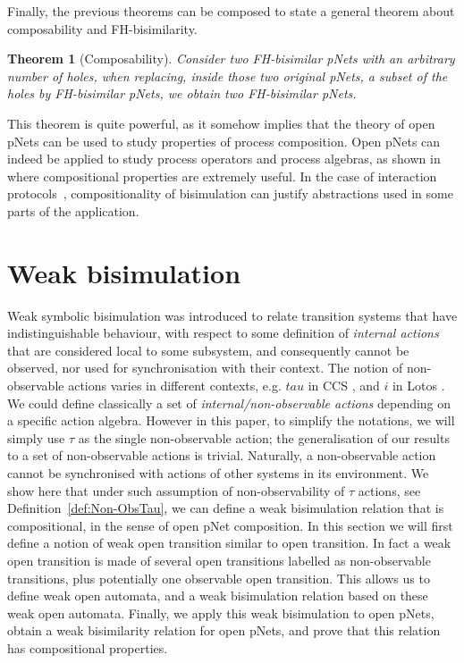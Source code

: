 \documentclass{elsarticle}
\newtheorem{thm}{Theorem}
\begin{document}
Finally, the previous theorems can be composed to state a general theorem about 
composability and FH-bisimilarity.
\begin{thm}[Composability] \label{thm-composability}
	Consider two FH-bisimilar pNets with an arbitrary number of holes, when replacing, 
	inside those two original pNets, a subset of the holes by FH-bisimilar pNets, we 
	obtain two FH-bisimilar pNets.
\end{thm}
This theorem is quite powerful, as it somehow implies that the theory of open pNets can be used to study properties of process composition. Open pNets can indeed be applied to study process operators and process algebras, as shown in~\cite{henrio:Forte2016} where compositional properties are extremely useful. In the case of interaction protocols~\cite{BHHM:FACS11}, compositionality of bisimulation can justify abstractions used in some parts of the application.



\section{Weak bisimulation}\label{sec:weak}

Weak symbolic bisimulation \cite{HennessyLin:TCS95} was introduced to relate transition systems
that have indistinguishable behaviour, with respect to some definition
of \emph{internal actions} that are considered local to some
subsystem, and consequently cannot be observed, nor used for
synchronisation with their context.
The notion of non-observable actions varies in different contexts,
e.g. $tau$ in CCS \cite{Milner:1982,Milner:1989}, and $i$ in Lotos \cite{BOLOGNESI:1987}. We could define classically a set of
\emph{internal/non-observable actions} depending on a specific action
algebra. However in this paper, to simplify the notations, we will simply use $\tau$ as the single non-observable action; the generalisation of our results to a set of non-observable actions is trivial. 
Naturally, a non-observable action cannot be synchronised with
actions of other systems in its environment. 
We show here that under such assumption of non-observability of $\tau$ actions, see Definition~\ref{def:Non-ObsTau}, we can define a weak bisimulation relation that is compositional, in the sense of open pNet composition. In this section we will first define a notion of weak open transition similar to open transition. In fact a weak open transition is made of several open transitions labelled as non-observable transitions, plus potentially one observable open transition. This allows us to define weak open automata, and a weak bisimulation relation based on these weak open automata. Finally, we apply this weak bisimulation to open pNets, obtain a weak bisimilarity relation for open pNets, and prove that this relation has compositional properties.
\end{document}
